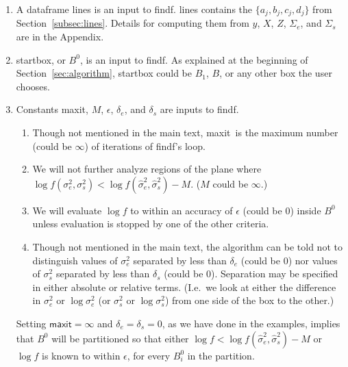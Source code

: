 \documentclass{report}
\newcommand{\textcompute}{\textsf}
\newcommand{\RL}{f}
\newcommand{\logRL}{\log\RL}
\newcommand{\sigssq}{\sigma_s^2}
\newcommand{\sigesq}{\sigma_e^2}
\newcommand{\sshat}{\hat\sigma^2_e,\hat\sigma^2_s}
\newcommand{\logRLss}{\logRL(\sigesq,\sigssq)}
\newcommand{\maxit}{\textcompute{maxit}}
\begin{document}
\begin{enumerate}
\item A dataframe \textcompute{lines} is an input to \textcompute{findf}.  \textcompute{lines} contains the
  $\{a_j, b_j, c_j, d_j \}$ from Section~\ref{subsec:lines}.
  Details for computing them from $y$, $X$, $Z$, $\Sigma_e$, and $\Sigma_s$ are in the Appendix.
\item \textcompute{startbox}, or $B^0$, is an input to \textcompute{findf}.  As explained at the beginning of
  Section~\ref{sec:algorithm}, \textcompute{startbox} could be $B_1$, $B$, or any other box the user chooses.
\item Constants \maxit, $M$, $\epsilon$, $\delta_e$, and $\delta_s$ are inputs to \textcompute{findf}.
	\begin{enumerate}[label=(\alph*)]
	\item Though not mentioned in the main text, \maxit\ is the maximum number (could be $\infty$) of iterations of
		\textcompute{findf}'s loop.
	\item We will not further analyze regions of the plane where
		$\logRLss < \logRL(\sshat) - M$.  ($M$ could be $\infty$.)
	\item We will evaluate $\logRL$ to within an accuracy of $\epsilon$ (could be 0) inside $B^0$
	         unless evaluation is stopped by one of the other criteria.
	\item Though not mentioned in the main text, the algorithm can be told not
		to distinguish values of $\sigesq$ separated by less
		than $\delta_e$ (could be 0) nor values of $\sigssq$ separated by
		less than $\delta_s$ (could be 0).  Separation may be specified
		in either absolute or relative terms. (I.e.\ we look at either the difference
		in $\sigesq$ or $\log\sigesq$ (or $\sigssq$ or $\log\sigssq$) from one
		side of the box to the other.)
	\end{enumerate}
  Setting $\maxit = \infty$ and $\delta_e = \delta_s = 0$, as we have done in the examples, implies
  that $B^0$ will be partitioned so that either
  $\logRL < \logRL(\sshat) - M$ or $\logRL$ is known to within $\epsilon$, for every $B^0_i$ in the partition.
  

\end{enumerate}
\end{document}

